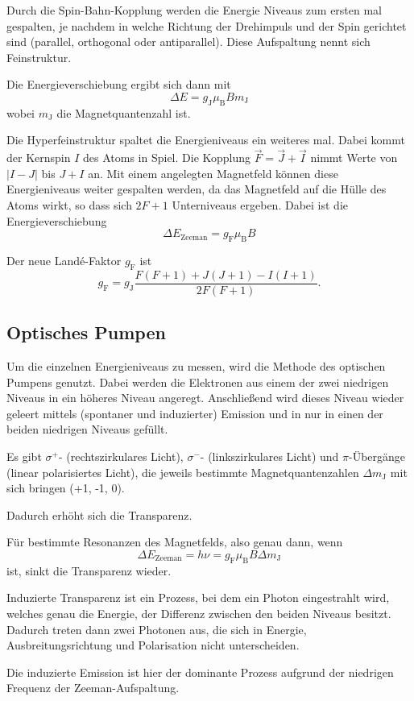 Durch die Spin-Bahn-Kopplung werden die Energie Niveaus zum ersten mal gespalten, je nachdem in welche Richtung der Drehimpuls und der Spin gerichtet sind (parallel, orthogonal oder antiparallel).
Diese Aufspaltung nennt sich Feinstruktur. 

Die Energieverschiebung ergibt sich dann mit 
\begin{equation*}
    \Delta E = g_\text{J} \mu_\text{B} B m_\text{J}
\end{equation*}
wobei $m_\text{J}$ die Magnetquantenzahl ist.

Die Hyperfeinstruktur spaltet die Energieniveaus ein weiteres mal. 
Dabei kommt der Kernspin $I$ des Atoms in Spiel.
Die Kopplung $\vec F = \vec J + \vec I$ nimmt Werte von $| I - J|$ bis $J+I$ an. 
Mit einem angelegten Magnetfeld können diese Energieniveaus weiter gespalten werden, da das Magnetfeld auf die Hülle des Atoms wirkt, so dass sich $2F+1$ Unterniveaus ergeben. 
Dabei ist die Energieverschiebung 
\begin{equation*}
    \Delta E_\text{Zeeman} = g_\text{F} \mu_\text{B} B
\end{equation*}

Der neue Landé-Faktor $g_\text{F}$ ist 
\begin{equation*}
    g_\text{F} = g_\text{J} \frac{F(F+1) + J(J+1) - I(I+1)}{2F(F+1)}.
\end{equation*}

\subsection{Optisches Pumpen}

Um die einzelnen Energieniveaus zu messen, wird die Methode des optischen Pumpens genutzt. Dabei werden die Elektronen aus einem der zwei niedrigen Niveaus in ein höheres Niveau angeregt. 
Anschließend wird dieses Niveau wieder geleert mittels (spontaner und induzierter) Emission und in nur in einen der beiden niedrigen Niveaus gefüllt. 

Es gibt $\sigma^+$- (rechtszirkulares Licht), $\sigma^-$- (linkszirkulares Licht) und $\pi$-Übergänge (linear polarisiertes Licht), die jeweils bestimmte Magnetquantenzahlen $\Delta m_\text{J}$ mit sich bringen (+1, -1, 0).


Dadurch erhöht sich die Transparenz. 

Für bestimmte Resonanzen des Magnetfelds, also genau dann, wenn 
\begin{equation*}
    \Delta E_\text{Zeeman} = h \nu = g_\text{F} \mu_\text{B} B \Delta m_\text{J}
\end{equation*}
ist, sinkt die Transparenz wieder.

Induzierte Transparenz ist ein Prozess, bei dem ein Photon eingestrahlt wird, welches genau die Energie, der Differenz zwischen den beiden Niveaus besitzt. Dadurch treten dann zwei Photonen aus, die sich in Energie, Ausbreitungsrichtung und Polarisation nicht unterscheiden. 

Die induzierte Emission ist hier der dominante Prozess aufgrund der niedrigen Frequenz der Zeeman-Aufspaltung. 









